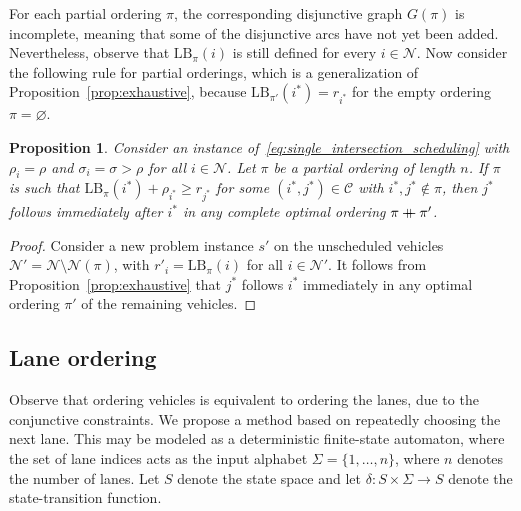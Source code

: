 \documentclass[a4paper]{article}
\newcommand\mdoubleplus{\mathbin{+\mkern-10mu+}}
\theoremstyle{definition}
\theoremstyle{plain}
\newtheorem{proposition}{Proposition}
\begin{document}
For each partial ordering $\pi$, the corresponding disjunctive graph $G(\pi)$ is
incomplete, meaning that some of the disjunctive arcs have not yet been added.
Nevertheless, observe that $\text{LB}_{\pi}(i)$ is still defined for every
$i \in \mathcal{N}$.
%
Now consider the following rule for partial orderings, which is a generalization
of Proposition~\ref{prop:exhaustive}, because
$\text{LB}_{\pi'}(i^{*}) = r_{i^{*}}$ for the empty ordering
$\pi = \varnothing$.

\begin{proposition}\label{prop:exhaustive_partial}
  Consider an instance of~\eqref{eq:single_intersection_scheduling} with
  $\rho_{i} = \rho$ and $\sigma_{i} = \sigma > \rho$ for all
  $i \in \mathcal{N}$.
  Let ${\pi}$ be a partial ordering of length $n$. If ${\pi}$ is such that
  $\text{LB}_{{\pi}}(i^{*}) + \rho_{i^{*}} \geq r_{j^{*}}$ for some
  $(i^{*},j^{*}) \in \mathcal{C}$ with $i^{*}, j^{*} \notin {\pi}$, then $j^{*}$ follows
  immediately after $i^{*}$ in any complete optimal ordering ${\pi} \mdoubleplus \pi'$.
\end{proposition}
\begin{proof}
  Consider a new problem instance $s'$ on the unscheduled vehicles
  $\mathcal{N}' = \mathcal{N} \setminus \mathcal{N}({\pi})$, with
  $r'_{i} = \text{LB}_{{\pi}}(i)$ for all $i \in \mathcal{N}'$.
  It follows from Proposition~\ref{prop:exhaustive} that $j^{*}$ follows $i^{*}$
  immediately in any optimal ordering $\pi'$ of the remaining vehicles.
\end{proof}


\newpage

\subsection*{Lane ordering}

Observe that ordering vehicles is equivalent to ordering the lanes, due to the
conjunctive constraints. We propose a method based on repeatedly choosing the
next lane. This may be modeled as a deterministic finite-state automaton, where
the set of lane indices acts as the input alphabet $\Sigma = \{ 1, \dots, n \}$,
where $n$ denotes the number of lanes. Let $S$ denote the state space and let
$\delta: S \times \Sigma \rightarrow S$ denote the state-transition function.
\end{document}
